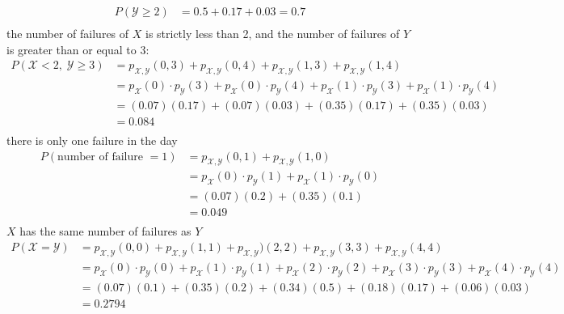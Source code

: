 \documentclass[12pt,border=4pt,multi]{article} %
\begin{document}
\begin{align*}
P(\mathcal{Y} \geq 2) &= 0.5 + 0.17 + 0.03 = \boxed{0.7}\\
\end{align*}
the number of failures of $X$ is strictly less than 2, and the number of failures of $Y$ is greater than or equal to 3:
\begin{align*}
P(\mathcal{X} < 2,\; \mathcal{Y} \geq 3) &= p_{\mathcal{X}, \mathcal{Y}}(0, 3) + p_{\mathcal{X}, \mathcal{Y}}(0, 4) + p_{\mathcal{X}, \mathcal{Y}}(1, 3) + p_{\mathcal{X}, \mathcal{Y}}(1, 4)\\
&= p_{\mathcal{X}}(0) \cdot p_{\mathcal{Y}}(3) + p_{\mathcal{X}}(0) \cdot p_{\mathcal{Y}}(4) + p_{\mathcal{X}}(1) \cdot p_{\mathcal{Y}}(3) + p_{\mathcal{X}}(1) \cdot p_{\mathcal{Y}}(4)\\
&= (0.07)(0.17) + (0.07)(0.03) + (0.35)(0.17) + (0.35)(0.03)\\
&= \boxed{0.084}\\
\end{align*}
there is only one failure in the day
\begin{align*}
P(\text{number of failure } = 1) &= p_{\mathcal{X}, \mathcal{Y}}(0, 1) + p_{\mathcal{X}, \mathcal{Y}}(1, 0)\\
&= p_{\mathcal{X}}(0) \cdot p_{\mathcal{Y}}(1) + p_{\mathcal{X}}(1) \cdot p_{\mathcal{Y}}(0)\\
&= (0.07)(0.2) + (0.35)(0.1)\\
&= \boxed{0.049}\\
\end{align*}
$X$ has the same number of failures as $Y$
\begin{align*}
P(\mathcal{X} = \mathcal{Y}) &= p_{\mathcal{X}, \mathcal{Y}}(0, 0) + p_{\mathcal{X}, \mathcal{Y}}(1, 1) + p_{\mathcal{X}, \mathcal{Y}})(2, 2) + p_{\mathcal{X}, \mathcal{Y}}(3, 3) + p_{\mathcal{X}, \mathcal{Y}}(4, 4)\\
&= p_{\mathcal{X}}(0) \cdot p_{\mathcal{Y}}(0) + p_{\mathcal{X}}(1) \cdot p_{\mathcal{Y}}(1) + p_{\mathcal{X}}(2) \cdot p_{\mathcal{Y}}(2) + p_{\mathcal{X}}(3) \cdot p_{\mathcal{Y}}(3) + p_{\mathcal{X}}(4) \cdot p_{\mathcal{Y}}(4)\\
&= (0.07)(0.1) + (0.35)(0.2) + (0.34)(0.5) + (0.18)(0.17) + (0.06)(0.03)\\
&= \boxed{0.2794}\\
\end{align*}
\\
\\
\\
\end{document}
